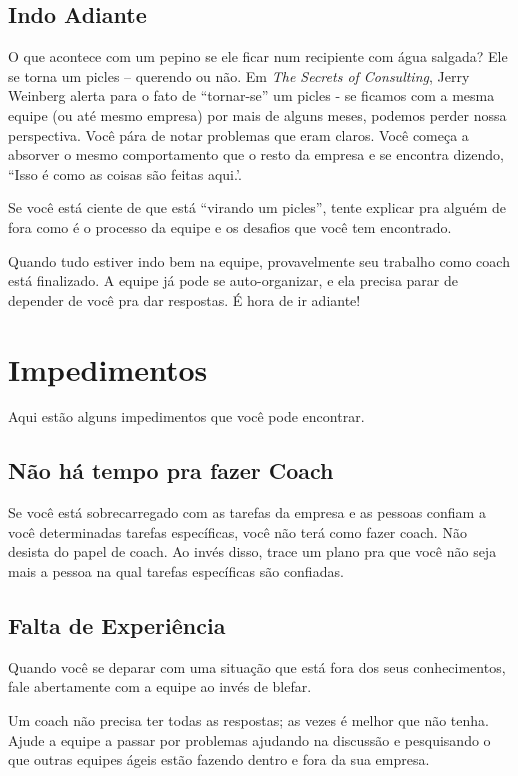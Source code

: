 \documentclass[a4paper, 10pt, font=plain]{abnt}
\begin{document}
\subsection{Indo Adiante}
O que acontece com um pepino se ele ficar num recipiente com água salgada? Ele se torna um picles -- querendo ou não. Em \textit{The Secrets of Consulting}, Jerry Weinberg alerta para o fato de ``tornar-se'' um picles - se ficamos com a mesma equipe (ou até mesmo empresa) por mais de alguns meses, podemos perder nossa perspectiva. Você pára de notar problemas que eram claros. Você começa a absorver o mesmo comportamento que o resto da empresa e se encontra dizendo, ``Isso é como as coisas são feitas aqui.'.

Se você está ciente de que está ``virando um picles'', tente explicar pra alguém de fora como é o processo da equipe e os desafios que você tem encontrado.

Quando tudo estiver indo bem na equipe, provavelmente seu trabalho como coach está finalizado. A equipe já pode se auto-organizar, e ela precisa parar de depender de você pra dar respostas. É hora de ir adiante!


\section{Impedimentos}
Aqui estão alguns impedimentos que você pode encontrar.

\subsection{Não há tempo pra fazer Coach}
Se você está sobrecarregado com as tarefas da empresa e as pessoas confiam a você determinadas tarefas específicas, você não terá como fazer coach. Não desista do papel de coach. Ao invés disso, trace um plano pra que você não seja mais a pessoa na qual tarefas específicas são confiadas.

\subsection{Falta de Experiência}
Quando você se deparar com uma situação que está fora dos seus conhecimentos, fale abertamente com a equipe ao invés de blefar.

Um coach não precisa ter todas as respostas; as vezes é melhor que não tenha. Ajude a equipe a passar por problemas ajudando na discussão e pesquisando o que outras equipes ágeis estão fazendo dentro e fora da sua empresa.
\end{document}
